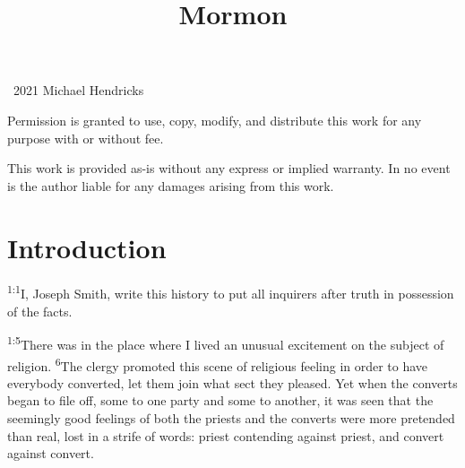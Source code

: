 \documentclass[openany,12pt,english]{book}
\title{Mormon}
\author{}
\date{}
\newenvironment{para}{\par\pretolerance=100\tolerance=200\setlength{\emergencystretch}{0.6em}\relax}{\par}
\begin{document}
\maketitle

{
\thispagestyle{empty}
\vspace*{\fill}
\begin{changemargin}{.8in}{.8in}
\begin{center}
\textcopyright{}~2021 Michael Hendricks

\vspace{0.5\baselineskip}

Permission is granted to use, copy, modify, and distribute
this work for any purpose with or without fee.

\vspace{0.5\baselineskip}

This work is provided as-is without any express or implied
warranty. In no event is the author liable for any damages
arising from this work.
\end{center}
\end{changemargin}
}
\clearpage{}

\tableofcontents
\clearpage{}

\markboth{}{}


\section*{Introduction}
\begin{para}
    \textsuperscript{1:1}\thinspace{}I, Jo\-seph Smith, write this his\-to\-ry to put all inquirers af\-ter truth in pos\-ses\-sion of the facts.
\end{para}

\begin{para}
    \textsuperscript{1:5}\thinspace{}There was in the place where I lived an un\-u\-su\-al ex\-cite\-ment on the sub\-ject of re\-li\-gion.
    \textsuperscript{6}\thinspace{}The cler\-gy pro\-mot\-ed this scene of re\-li\-gious feel\-ing in or\-der to have eve\-ry\-bod\-y con\-vert\-ed, let them join what sect they pleased. Yet when the converts be\-gan to file off, some to one par\-ty and some to an\-oth\-er, it was seen that the seemingly good feelings of both the priests and the converts were more pre\-tend\-ed than re\-al, lost in a strife of words: priest contending a\-gainst priest, and con\-vert a\-gainst con\-vert.
\end{para}
\end{document}
